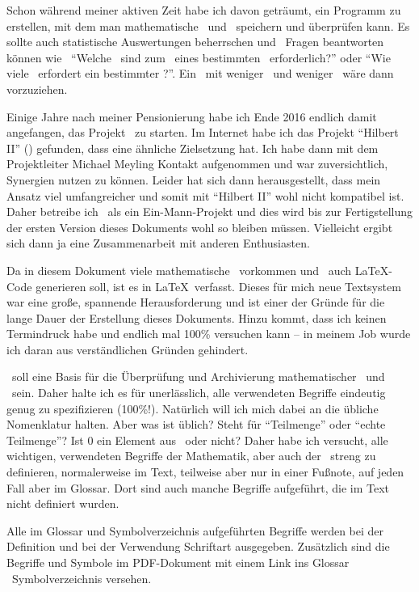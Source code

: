 Schon während meiner aktiven Zeit habe ich davon geträumt, ein Programm zu erstellen, mit dem man mathematische \Saetze\ und \Beweise\ speichern und überprüfen kann.
Es sollte auch statistische Auswertungen beherrschen und \textua\ Fragen beantworten können wie \textzB\
"`Welche \Axiome\ sind zum \Beweis\ eines bestimmten \Satzes\ erforderlich?"' oder
"`Wie viele \Beweisschritte\ erfordert ein bestimmter \Beweis?"'.
Ein \Beweis\ mit weniger \Axiomen\ und weniger \Beweisschritten\ wäre dann vorzuziehen.

Einige Jahre nach meiner Pensionierung habe ich Ende 2016 endlich damit angefangen, das Projekt \ASBA\ zu starten.
Im Internet habe ich das Projekt "`Hilbert II"' (\cite{bib:HilbertII}) gefunden, dass eine ähnliche Zielsetzung hat.
Ich habe dann mit dem Projektleiter Michael Meyling Kontakt aufgenommen und war zuversichtlich, Synergien nutzen zu können.
Leider hat sich dann herausgestellt, dass mein Ansatz viel umfangreicher und somit mit "`Hilbert II"' wohl nicht kompatibel ist.
Daher betreibe ich \ASBA\ als ein Ein-Mann-Projekt und dies wird bis zur Fertigstellung der ersten Version dieses Dokuments wohl so bleiben müssen.
Vielleicht ergibt sich dann ja eine Zusammenarbeit mit anderen Enthusiasten.

Da in diesem Dokument viele mathematische \Formeln\ vorkommen und \ASBA\ auch \LaTeX-Code generieren soll, ist es in \LaTeX\ verfasst.
Dieses für mich neue Textsystem war eine große, spannende Herausforderung und ist einer der Gründe für die lange Dauer der Erstellung dieses Dokuments.
Hinzu kommt, dass ich keinen Termindruck habe und endlich mal 100\% versuchen kann -- in meinem Job wurde ich daran aus verständlichen Gründen gehindert.

\ASBA\ soll eine Basis für die Überprüfung und Archivierung mathematischer \Saetze\ und \Beweise\ sein.
Daher halte ich es für unerlässlich, alle verwendeten Begriffe eindeutig genug zu spezifizieren (100\%!).
Natürlich will ich mich dabei an die übliche Nomenklatur halten.
Aber was ist üblich?
Steht \chrqt{\MtsSubset} für "`Teilmenge"' oder "`echte Teilmenge"'?
Ist $0$ ein Element aus \MtsIN\ oder nicht?
Daher habe ich versucht, alle wichtigen, verwendeten Begriffe der Mathematik, aber auch der \formalenMetasprache\ streng zu definieren, normalerweise im Text, teilweise aber nur in einer Fußnote, auf jeden Fall aber im Glossar.
Dort sind auch manche Begriffe aufgeführt, die im Text nicht definiert wurden.

Alle im Glossar und Symbolverzeichnis aufgeführten Begriffe werden bei der Definition  und bei der Verwendung  Schriftart ausgegeben. Zusätzlich sind die Begriffe und Symbole im PDF-Dokument mit einem Link ins Glossar \textbzw\ Symbolverzeichnis versehen.

